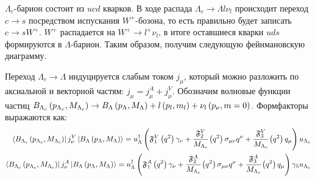  
$\Lambda_c$-барион состоит из $ucd$ кварков. В ходе распада 
$\Lambda_c \rightarrow \Lambda l \nu_l$ происходит переход $c \to s$ 
посредством испускания $W^+$-бозона, то есть правильно будет записать $c \to s W^+$.
$W^+$ распадается на $W^+ \to l^+ \nu_l$, в итоге оставшиеся кварки 
$uds$ формируются в $\Lambda$-барион. Таким образом, получим следующую 
фейнмановскую диаграмму.
 
\begin{figure}[H]
    \centering
\end{figure}
 
Переход $\Lambda_c \to \Lambda$ индуцируется слабым током $j_\mu$, 
который можно разложить по аксиальной и векторной частям: 
$j_\mu = j_\mu^A + j_\mu^V$.
Обозначим волновые функции частиц
$B_{\Lambda_c} \left( p_{\Lambda_c}, M_{\Lambda_c} \right) 
\to B_{\Lambda} \left( p_{\Lambda}, M_{\Lambda} \right) 
+ l\left( p_l, m_l \right) + \nu_l \left( p_\nu, m = 0 \right)$. 
Формфакторы выражаются как:
\begin{eqnarray}
    \bra{B_{\Lambda_c} \left( p_{\Lambda_c}, M_{\Lambda_c} \right)}
    j_\nu^V
    \ket{B_{\Lambda} \left( p_{\Lambda}, M_{\Lambda} \right)} = 
    u_\Lambda^\dag \left( \mathfrak F^V_1 \left( q^2 \right) \gamma_\nu + 
    \cfrac{\mathfrak F^V_2}{M_{\Lambda_c}} \left( q^2 \right) \sigma_{\mu\nu} q^\nu + 
    \cfrac{\mathfrak F^V_3}{M_{\Lambda_c}} \left( q^2 \right) q_\mu \right) u_{\Lambda_c} \\
    \bra{B_{\Lambda_c} \left( p_{\Lambda_c}, M_{\Lambda_c} \right)}
    j_\nu^A
    \ket{B_{\Lambda} \left( p_{\Lambda}, M_{\Lambda} \right)} = 
    u_\Lambda^\dag \left( \mathfrak F^A_1 \left( q^2 \right) \gamma_\nu + 
    \cfrac{\mathfrak F^A_2}{M_{\Lambda_c}} \left( q^2 \right) \sigma_{\mu\nu} q^\nu + 
    \cfrac{\mathfrak F^A_3}{M_{\Lambda_c}} \left( q^2 \right) q_\mu \right) \gamma_5 u_{\Lambda_c} 
    \label{eq:def_form}
\end{eqnarray}
 
